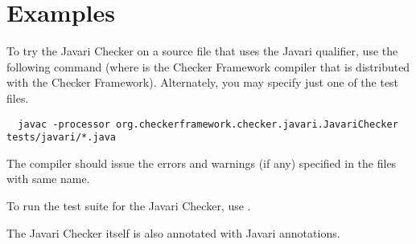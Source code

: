 \section{Examples\label{javari-examples}}

To try the Javari Checker on a source file that uses the Javari
qualifier, use the following command (where  is the Checker
Framework compiler that
is distributed with the Checker Framework).  Alternately, you may
specify just one of the test files.

\begin{Verbatim}
  javac -processor org.checkerframework.checker.javari.JavariChecker tests/javari/*.java
\end{Verbatim}

\noindent
The compiler should issue the errors and warnings (if any) specified in the
 files with same name.

To run the test suite for the Javari Checker, use .

The Javari Checker itself is also annotated with Javari annotations.


